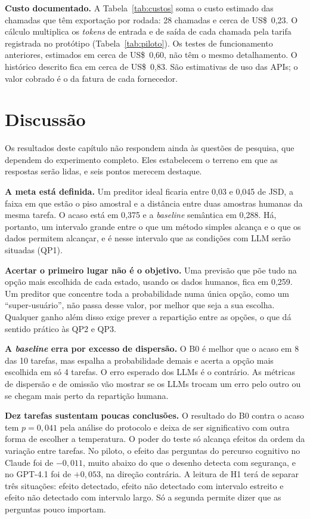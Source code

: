 \documentclass[12pt,oneside,a4paper,chapter=TITLE,english,brazil]{abntex2}
\begin{document}
\begin{real}
\textbf{Custo documentado.} A Tabela~\ref{tab:custos} soma o custo estimado das chamadas que têm exportação por rodada: 28 chamadas e cerca de US\$~0,23. O cálculo multiplica os \textit{tokens} de entrada e de saída de cada chamada pela tarifa registrada no protótipo (Tabela~\ref{tab:piloto}). Os testes de funcionamento anteriores, estimados em cerca de US\$~0,60, não têm o mesmo detalhamento. O histórico descrito fica em cerca de US\$~0,83. São estimativas de uso das APIs; o valor cobrado é o da fatura de cada fornecedor.
\end{real}

\section{Discussão}
\label{sec:discussao}

Os resultados deste capítulo não respondem ainda às questões de pesquisa, que dependem do experimento completo. Eles estabelecem o terreno em que as respostas serão lidas, e seis pontos merecem destaque.

\textbf{A meta está definida.} Um preditor ideal ficaria entre 0,03 e 0,045 de JSD, a faixa em que estão o piso amostral e a distância entre duas amostras humanas da mesma tarefa. O acaso está em 0,375 e a \textit{baseline} semântica em 0,288. Há, portanto, um intervalo grande entre o que um método simples alcança e o que os dados permitem alcançar, e é nesse intervalo que as condições com LLM serão situadas (QP1).

\textbf{Acertar o primeiro lugar não é o objetivo.} Uma previsão que põe tudo na opção mais escolhida de cada estado, usando os dados humanos, fica em 0,259. Um preditor que concentre toda a probabilidade numa única opção, como um ``super-usuário'', não passa desse valor, por melhor que seja a sua escolha. Qualquer ganho além disso exige prever a repartição entre as opções, o que dá sentido prático às QP2 e QP3.

\textbf{A \textit{baseline} erra por excesso de dispersão.} O B0 é melhor que o acaso em 8 das 10 tarefas, mas espalha a probabilidade demais e acerta a opção mais escolhida em só 4 tarefas. O erro esperado dos LLMs é o contrário. As métricas de dispersão e de omissão vão mostrar se os LLMs trocam um erro pelo outro ou se chegam mais perto da repartição humana.

\textbf{Dez tarefas sustentam poucas conclusões.} O resultado do B0 contra o acaso tem $p=0{,}041$ pela análise do protocolo e deixa de ser significativo com outra forma de escolher a temperatura. O poder do teste só alcança efeitos da ordem da variação entre tarefas. No piloto, o efeito das perguntas do percurso cognitivo no Claude foi de $-0{,}011$, muito abaixo do que o desenho detecta com segurança, e no GPT-4.1 foi de $+0{,}053$, na direção contrária. A leitura de H1 terá de separar três situações: efeito detectado, efeito não detectado com intervalo estreito e efeito não detectado com intervalo largo. Só a segunda permite dizer que as perguntas pouco importam.
\end{document}
